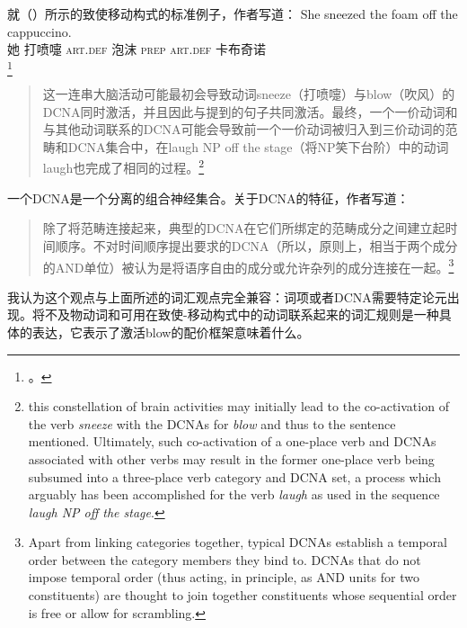 \begin{exe}
\begin{xlist}[iv.]
\begin{exe}
\begin{xlist}[iv.]
就（）所示的致使移动构式的标准例子，作者写道：
\ea
\gll She sneezed the foam off the cappuccino.\\
     她 打喷嚏 \textsc{art}.\textsc{def} 泡沫 \textsc{prep} \textsc{art}.\textsc{def} 卡布奇诺\\
\footnote{%
 。
}
\z
\begin{quotation}
  这一连串大脑活动可能最初会导致动词sneeze（打喷嚏）与blow（吹风）的DCNA同时激活，并且因此与提到的句子共同激活。最终，一个一价动词和与其他动词联系的DCNA可能会导致前一个一价动词被归入到三价动词的范畴和DCNA集合中，在laugh NP off the stage（将NP笑下台阶）中的动词laugh也完成了相同的过程。\citep*{PCShandbookCxG}\footnote{%
  this constellation of brain activities may initially lead to the co-activation of the verb \emph{sneeze}
  with the DCNAs for \emph{blow} and thus to the sentence mentioned. Ultimately, such co-activation of a
  one-place verb and DCNAs associated with other verbs may result in the former one-place verb being
  subsumed into a three-place verb category and DCNA set, a process which arguably has been
  accomplished for the verb \emph{laugh} as used in the sequence \emph{laugh NP off the stage}. 
  }
\end{quotation}
一个DCNA是一个分离的组合神经集合。关于DCNA的特征，作者写道：
\begin{quotation}
除了将范畴连接起来，典型的DCNA在它们所绑定的范畴成分之间建立起时间顺序。不对时间顺序提出要求的DCNA（所以，原则上，相当于两个成分的AND单位）被认为是将语序自由的成分或允许杂列的成分连接在一起。\citep*[]{PCShandbookCxG}\footnote{%
Apart from linking categories together, typical DCNAs establish a temporal order between the
category members they bind to. DCNAs that do not impose temporal order (thus acting, in principle,
as AND units for two constituents) are thought to join together constituents whose sequential order
is free or allow for scrambling.
}
\end{quotation}
我认为这个观点与上面所述的词汇观点完全兼容：词项或者DCNA需要特定论元出现。将不及物动词和可用在致使-移动构式中的动词联系起来的词汇规则是一种具体的表达，它表示了激活blow的配价框架意味着什么。


\end{xlist}
\end{exe}
\end{xlist}
\end{exe}
